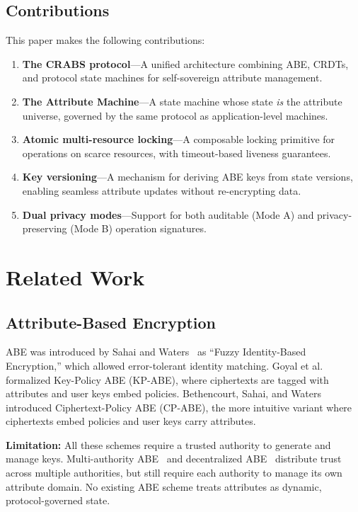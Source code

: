 \documentclass[sigconf,nonacm]{acmart}
\newcommand{\crab}{\textsc{CRABS}}
\begin{document}
\subsection{Contributions}

This paper makes the following contributions:

\begin{enumerate}
    \item \textbf{The \crab{} protocol}---A unified architecture combining ABE, CRDTs, and protocol state machines for self-sovereign attribute management.
    \item \textbf{The Attribute Machine}---A state machine whose state \textit{is} the attribute universe, governed by the same protocol as application-level machines.
    \item \textbf{Atomic multi-resource locking}---A composable locking primitive for operations on scarce resources, with timeout-based liveness guarantees.
    \item \textbf{Key versioning}---A mechanism for deriving ABE keys from state versions, enabling seamless attribute updates without re-encrypting data.
    \item \textbf{Dual privacy modes}---Support for both auditable (Mode A) and privacy-preserving (Mode B) operation signatures.
\end{enumerate}

\section{Related Work}

\subsection{Attribute-Based Encryption}

ABE was introduced by Sahai and Waters~\cite{sahai2005fuzzy} as ``Fuzzy Identity-Based Encryption,'' which allowed error-tolerant identity matching. Goyal et al.~\cite{goyal2006abe} formalized Key-Policy ABE (KP-ABE), where ciphertexts are tagged with attributes and user keys embed policies. Bethencourt, Sahai, and Waters~\cite{bethencourt2007cpabe} introduced Ciphertext-Policy ABE (CP-ABE), the more intuitive variant where ciphertexts embed policies and user keys carry attributes.

\textbf{Limitation:} All these schemes require a trusted authority to generate and manage keys. Multi-authority ABE~\cite{chase2007multi} and decentralized ABE~\cite{lewko2011decentralizing} distribute trust across multiple authorities, but still require each authority to manage its own attribute domain. No existing ABE scheme treats attributes as dynamic, protocol-governed state.
\end{document}
